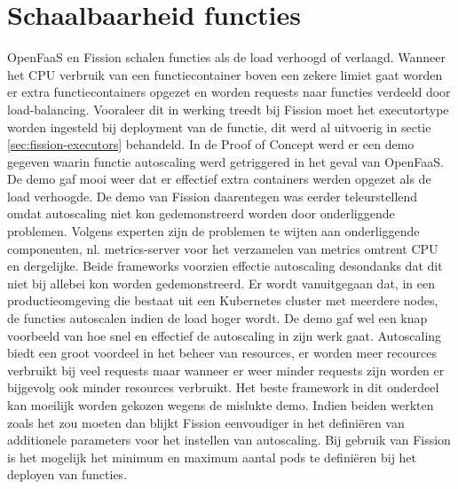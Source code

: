 \section{Schaalbaarheid functies}
OpenFaaS en Fission schalen functies als de load verhoogd of verlaagd. Wanneer het CPU verbruik van een functiecontainer boven een zekere limiet gaat worden er extra functiecontainers opgezet en worden requests naar functies verdeeld door load-balancing. Vooraleer dit in werking treedt bij Fission moet het executortype worden ingesteld bij deployment van de functie, dit werd al uitvoerig in sectie \ref{sec:fission-executors} behandeld. In de Proof of Concept werd er een demo gegeven waarin functie autoscaling werd getriggered in het geval van OpenFaaS. De demo gaf mooi weer dat er effectief extra containers werden opgezet als de load verhoogde. De demo van Fission daarentegen was eerder teleurstellend omdat autoscaling niet kon gedemonstreerd worden door onderliggende problemen. Volgens experten zijn de problemen te wijten aan onderliggende componenten, nl. metrics-server voor het verzamelen van metrics omtrent CPU en dergelijke. Beide frameworks voorzien effectie autoscaling desondanks dat dit niet bij allebei kon worden gedemonstreerd. Er wordt vanuitgegaan dat, in een productieomgeving die bestaat uit een Kubernetes cluster met meerdere nodes, de functies autoscalen indien de load hoger wordt. De demo gaf wel een knap voorbeeld van hoe snel en effectief de autoscaling in zijn werk gaat. Autoscaling biedt een groot voordeel in het beheer van resources, er worden meer recources verbruikt bij veel requests maar wanneer er weer minder requests zijn worden er bijgevolg ook minder resources verbruikt. Het beste framework in dit onderdeel kan moeilijk worden gekozen wegens de mislukte demo. Indien beiden werkten zoals het zou moeten dan blijkt Fission eenvoudiger in het definiëren van additionele parameters voor het instellen van autoscaling. Bij gebruik van Fission is het mogelijk het minimum en maximum aantal pods te definiëren bij het deployen van functies.